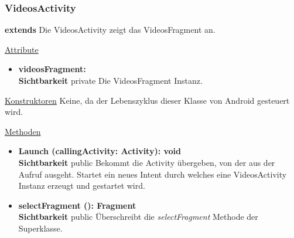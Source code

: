 \subsubsection{VideosActivity} \label{app:klasse:VideosActivity}
\textbf{extends}  \newline
Die VideosActivity zeigt das VideosFragment an.
\newline

\underline{Attribute}
\begin{itemize}
\itemsep0pt
\item \textbf{videosFragment: } \hfill\\ 
\textbf{Sichtbarkeit} private\newline
Die VideosFragment Instanz.

\end{itemize}

\underline{Konstruktoren}\newline
\indent Keine, da der Lebenszyklus dieser Klasse von Android gesteuert wird.\newline

\underline{Methoden}
\begin{itemize}
\itemsep0pt

\item \textbf{Launch (callingActivity: Activity): void}\hfill\\
\textbf{Sichtbarkeit} public\newline
Bekommt die Activity übergeben, von der aus der Aufruf ausgeht. Startet ein neues Intent durch welches eine VideosActivity Instanz erzeugt und gestartet wird.

\item \textbf{selectFragment (): Fragment}\hfill\\
\textbf{Sichtbarkeit} public\newline
Überschreibt die \textit{selectFragment} Methode der Superklasse.

\end{itemize}